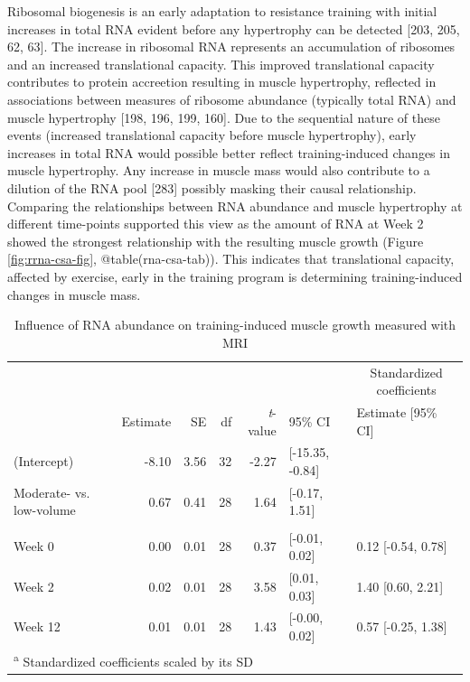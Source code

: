 \documentclass[twoside,10pt]{gihclass} %
\begin{document}
Ribosomal biogenesis is an early adaptation to resistance training with initial increases in total RNA evident before any hypertrophy can be detected
{[}203, 205, 62, 63{]}.
The increase in ribosomal RNA represents an accumulation of ribosomes and an increased translational capacity. This improved translational capacity contributes to protein accreetion resulting in muscle hypertrophy, reflected in associations between measures of ribosome abundance (typically total RNA) and muscle hypertrophy
{[}198, 196, 199, 160{]}.
Due to the sequential nature of these events (increased translational capacity before muscle hypertrophy), early increases in total RNA would possible better reflect training-induced changes in muscle hypertrophy.
Any increase in muscle mass would also contribute to a dilution of the RNA pool
{[}283{]}
possibly masking their causal relationship.
Comparing the relationships between RNA abundance and muscle hypertrophy at different time-points supported this view as the amount of RNA at Week 2 showed the strongest relationship with the resulting muscle growth (Figure \ref{fig:rrna-csa-fig}, @table(rna-csa-tab)). This indicates that translational capacity, affected by exercise, early in the training program is determining training-induced changes in muscle mass.
\begin{table}

\caption{\label{tab:rna-csa-tab}Influence of RNA abundance on training-induced muscle growth measured with MRI}
\centering
\fontsize{8}{10}\selectfont
\begin{tabular}[t]{lrrrrll}
\toprule
\multicolumn{6}{c}{ } & \multicolumn{1}{c}{Standardized coefficients} \\
\cmidrule(l{3pt}r{3pt}){7-7}
 & Estimate & SE & df & \textit{t}-value & 95\% CI & Estimate [95\% CI]\\
\midrule
(Intercept) & -8.10 & 3.56 & 32 & -2.27 & [-15.35, -0.84] & \\
Moderate- vs. low-volume & 0.67 & 0.41 & 28 & 1.64 & [-0.17, 1.51] & \\
\addlinespace[0.3em]
\multicolumn{7}{l}{\textbf{RNA abundance (ng mg\textsuperscript{-1})}}\\
\hspace{1em}Week 0 & 0.00 & 0.01 & 28 & 0.37 & [-0.01, 0.02] & 0.12 [-0.54, 0.78]\\
\hspace{1em}Week 2 & 0.02 & 0.01 & 28 & 3.58 & [0.01, 0.03] & 1.40 [0.60, 2.21]\\
\hspace{1em}Week 12 & 0.01 & 0.01 & 28 & 1.43 & [-0.00, 0.02] & 0.57 [-0.25, 1.38]\\
\bottomrule
\multicolumn{7}{l}{\textsuperscript{a} Standardized coefficients scaled by its SD}\\
\end{tabular}
\end{table}
\end{document}

